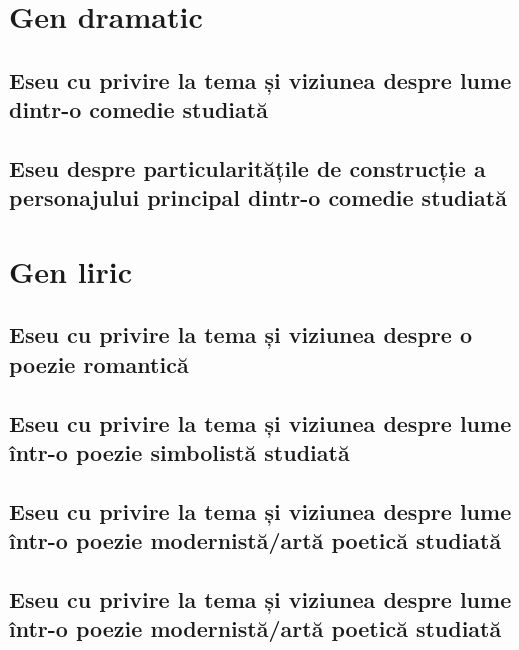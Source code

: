 \documentclass[
 12pt,                       %
 a4paper                     %
]{book}
\begin{document}
\part{Gen dramatic}


\chapter{Eseu cu privire la tema și viziunea despre lume dintr-o comedie studiată}


\chapter{Eseu despre particularitățile de construcție a personajului principal dintr-o comedie studiată}




\part{Gen liric}


\chapter{Eseu cu privire la tema și viziunea despre o poezie romantică}



\chapter{Eseu cu privire la tema și viziunea despre lume într-o poezie simbolistă studiată}



\chapter{Eseu cu privire la tema și viziunea despre lume într-o poezie modernistă/artă poetică studiată}



\chapter{Eseu cu privire la tema și viziunea despre lume într-o poezie modernistă/artă poetică studiată}

\end{document}
